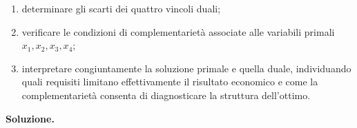 \begin{exercise}
\begin{enumerate}
\item determinare gli scarti dei quattro vincoli duali;

\item verificare le condizioni di complementariet\`a associate alle variabili
primali $x_1,x_2,x_3,x_4$;

\item interpretare congiuntamente la soluzione primale e quella duale,
individuando quali requisiti limitano effettivamente il risultato economico e
come la complementariet\`a consenta di diagnosticare la struttura
dell'ottimo.

\end{enumerate}

\end{exercise}

\noindent
\textbf{Soluzione.}

